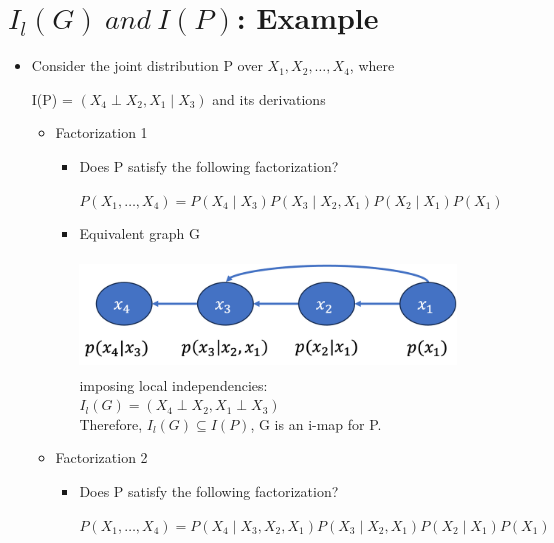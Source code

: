 \documentclass[11pt,a4paper]{report}
\begin{document}
\section{$I_{l}(G)\ and\ I(P)$: Example}

\begin{itemize}
    \item Consider the joint distribution P over $X_{1}, X_{2}, \ldots, X_{4}$, where
    \begin{center}
        I(P) =  {$(X_{4} \perp X_{2}, X_{1} \mid X_{3})$ and its derivations}
    \end{center}
    \begin{itemize}
        \item Factorization 1
        \begin{itemize}
            \item Does P satisfy the following factorization?
        \begin{center}
            $P(X_{1}, \ldots, X_{4}) = P(X_{4} \mid X_{3})P(X_{3} \mid X_{2},X_{1})P(X_{2} \mid X_{1})P(X_{1})$ 
        \end{center}
        \item Equivalent graph G
        \begin{center}
            \includegraphics[width = 10cm, height = 3cm]{graph_vis.png}\\
            imposing local independencies:\\
            $I_{l}(G) = {(X_{4} \perp X_{2}, X_{1} \perp X_{3})}$\\
            Therefore, $I_{l}(G) \subseteq I(P)$, G is an i-map for P.
        \end{center}
        \end{itemize}
        \item Factorization 2
        \begin{itemize}
            \item Does P satisfy the following factorization?
        \begin{center}
            $P(X_{1}, \ldots, X_{4}) = P(X_{4} \mid X_{3}, X_{2},X_{1})P(X_{3} \mid X_{2},X_{1})P(X_{2} \mid X_{1})P(X_{1})$ 
        \end{center}

\end{itemize}
\end{itemize}
\end{itemize}
\end{document}
